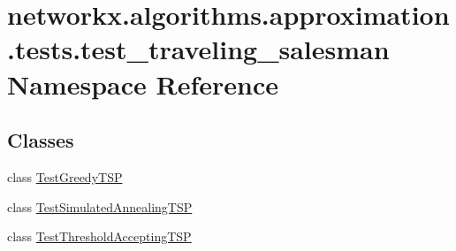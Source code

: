 \hypertarget{namespacenetworkx_1_1algorithms_1_1approximation_1_1tests_1_1test__traveling__salesman}{}\section{networkx.\+algorithms.\+approximation.\+tests.\+test\+\_\+traveling\+\_\+salesman Namespace Reference}
\label{namespacenetworkx_1_1algorithms_1_1approximation_1_1tests_1_1test__traveling__salesman}
\subsection*{Classes}
\begin{DoxyCompactItemize}
\item 
class \hyperlink{classnetworkx_1_1algorithms_1_1approximation_1_1tests_1_1test__traveling__salesman_1_1TestGreedyTSP}{Test\+Greedy\+T\+SP}
\item 
class \hyperlink{classnetworkx_1_1algorithms_1_1approximation_1_1tests_1_1test__traveling__salesman_1_1TestSimulatedAnnealingTSP}{Test\+Simulated\+Annealing\+T\+SP}
\item 
class \hyperlink{classnetworkx_1_1algorithms_1_1approximation_1_1tests_1_1test__traveling__salesman_1_1TestThresholdAcceptingTSP}{Test\+Threshold\+Accepting\+T\+SP}
\end{DoxyCompactItemize}
